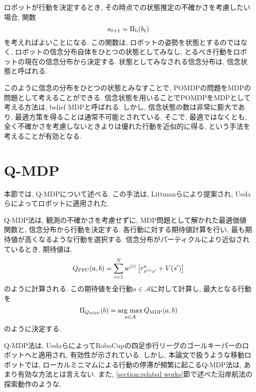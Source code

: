 ロボットが行動を決定するとき, その時点での状態推定の不確かさを考慮したい場合, 関数
\begin{equation}
\label{policy belief}
  a_{t+1} = \Pi_{\rm b} (b_{t})
\end{equation}
を考えればよいことになる. 
この関数は, ロボットの姿勢を状態とするのではなく, ロボットの信念分布自体をひとつの状態としてみなし, 
とるべき行動をロボットの現在の信念分布から決定する. 
状態としてみなされる信念分布は, 信念状態と呼ばれる. 

このように信念の分布をひとつの状態とみなすことで, POMDPの問題をMDPの問題として考えることができる. 
信念状態を用いることでPOMDPをMDPとして考える方法は, belief MDPと呼ばれる\cite{kaelbling1998}. 
しかし, 信念状態の数は非常に膨大であり, 最適方策を得ることは通常不可能とされている. 
そこで, 最適ではなくとも, 全く不確かさを考慮しないときよりは優れた行動を近似的に得る, という手法を考えることが有効となる. 


\section{Q-MDP} \label{section:q-mdp}
本節では, Q-MDPについて述べる. 
この手法は, Littmanらにより提案され, Uedaらによってロボットに適用された\cite{littman1995, ueda2003iros}. 

Q-MDP法は, 観測の不確かさを考慮せずに, MDP問題として解かれた最適価値関数と, 信念分布から行動を決定する. 
各行動に対する期待値計算を行い, 最も期待値が高くなるような行動を選択する. 
信念分布がパーティクルにより近似されているとき, 期待値は, 
\begin{equation}
\label{equation:q-mdp}
  Q_{\rm PFC}(a, b) = \sum_{i=1}^{N} w^{(i)}
                      \left[r^{a}_{s^{(i)} s^{\prime}} + V(s^{\prime}) \right]
\end{equation}
のように計算される. 
この期待値を全行動$a \in \mathcal{A}$に対して計算し, 最大となる行動を
\begin{equation}
\label{equation:pi q-mdp}
  \Pi_{Q_{\rm MDP}}(b) = \mathop{\rm arg~max}\limits_{a \in \mathcal{A}} Q_{\rm MDP}(a, b)
\end{equation}
のように決定する. 

Q-MDP法は, UedaらによってRoboCupの四足歩行リーグのゴールキーパーのロボットへと適用され, 有効性が示されている\cite{ueda2003iros}. 
しかし, 本論文で扱うような移動ロボットでは, ローカルミニマムによる行動の停滞が頻繁に起こるQ-MDP法は, あまり有効な方法とは言えない. 
また, \ref{section:related works}節で述べた沿岸航法の探索動作のような, 

